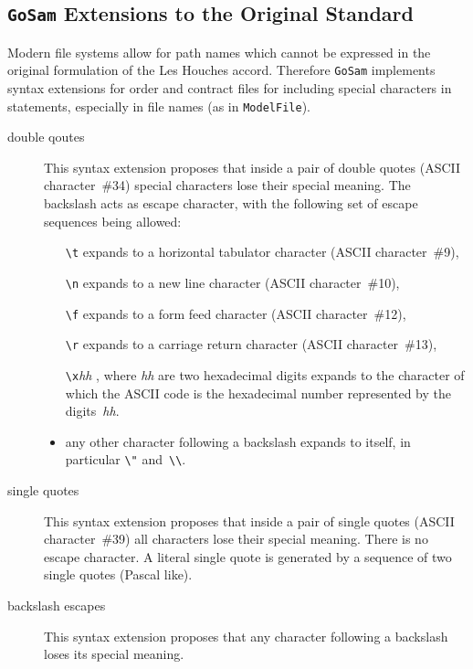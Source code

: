 \documentclass[11pt,a4paper]{refrep}
\newcommand{\golemversion}{{1{.}0}}
\newcommand{\golem}{{\tt GoSam}\xspace}
\newcommand{\golemv}[1][\golemversion]{{\tt GoSam}\xspace}
\begin{document}
\subsection{\golem{} Extensions to the Original Standard}
\label{sec:olp:extensions}
Modern file systems allow for path names which cannot be expressed in
the original formulation of the Les Houches accord. Therefore \golemv{}
implements syntax extensions for order and contract files for including
special characters in statements, especially in file names (as in
\lstinline!ModelFile!).

\begin{description}
\item[double qoutes] This syntax extension proposes that inside a pair
   of double quotes (ASCII character~\#34) special characters lose their
   special meaning. The backslash acts as escape character, with the following
   set of escape sequences being allowed:
   \begin{itemize}
   \item[\texttt{\textbackslash t}] expands to a horizontal tabulator
        character (ASCII character~\#9),
   \item[\texttt{\textbackslash n}] expands to a new line character
   	(ASCII character~\#10),
   \item[\texttt{\textbackslash f}] expands to a form feed character
   	(ASCII character~\#12),
   \item[\texttt{\textbackslash r}] expands to a carriage return character
   	(ASCII character~\#13),
   \item[\texttt{\textbackslash x}\textit{hh}], where \textit{hh} are two
        hexadecimal digits expands to the character of which the
        ASCII code is the hexadecimal number represented by the
	digits~\textit{hh}.
   \item any other character following a backslash expands to itself,
        in particular \texttt{\textbackslash"}
	and~\texttt{\textbackslash\textbackslash}.
   \end{itemize}
\item[single quotes] This syntax extension proposes that inside a pair
   of single quotes (ASCII character~\#39) all characters lose their
   special meaning. There is no escape character. A literal single quote
   is generated by a sequence of two single quotes (Pascal like).
\item[backslash escapes] This syntax extension proposes that any character
   following a backslash loses its special meaning.
\end{description}
\end{document}

